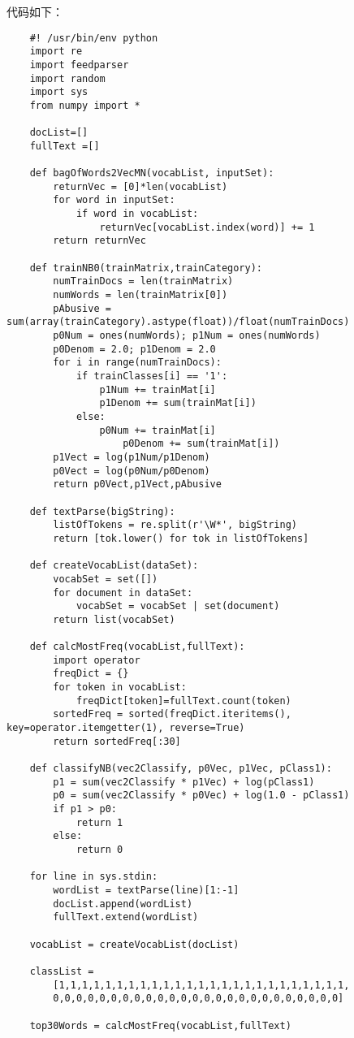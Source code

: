 代码如下：

\begin{lstlisting}
	#! /usr/bin/env python
	import re
	import feedparser
	import random
	import sys
	from numpy import *

	docList=[]
	fullText =[]

	def bagOfWords2VecMN(vocabList, inputSet):
	    returnVec = [0]*len(vocabList)
	    for word in inputSet:
	        if word in vocabList:
	            returnVec[vocabList.index(word)] += 1
	    return returnVec

	def trainNB0(trainMatrix,trainCategory):
	    numTrainDocs = len(trainMatrix)
	    numWords = len(trainMatrix[0])
	    pAbusive = sum(array(trainCategory).astype(float))/float(numTrainDocs)
	    p0Num = ones(numWords); p1Num = ones(numWords)
	    p0Denom = 2.0; p1Denom = 2.0
	    for i in range(numTrainDocs):
	        if trainClasses[i] == '1':
	            p1Num += trainMat[i]
	            p1Denom += sum(trainMat[i])
	        else:
	            p0Num += trainMat[i]
		            p0Denom += sum(trainMat[i])
	    p1Vect = log(p1Num/p1Denom)
	    p0Vect = log(p0Num/p0Denom)
	    return p0Vect,p1Vect,pAbusive

	def textParse(bigString):
	    listOfTokens = re.split(r'\W*', bigString)
	    return [tok.lower() for tok in listOfTokens]

	def createVocabList(dataSet):
	    vocabSet = set([])
	    for document in dataSet:
	        vocabSet = vocabSet | set(document)
	    return list(vocabSet)

	def calcMostFreq(vocabList,fullText):
	    import operator
	    freqDict = {}
	    for token in vocabList:
	        freqDict[token]=fullText.count(token)
	    sortedFreq = sorted(freqDict.iteritems(), key=operator.itemgetter(1), reverse=True)
	    return sortedFreq[:30]

	def classifyNB(vec2Classify, p0Vec, p1Vec, pClass1):
	    p1 = sum(vec2Classify * p1Vec) + log(pClass1)
	    p0 = sum(vec2Classify * p0Vec) + log(1.0 - pClass1)
	    if p1 > p0:
	        return 1
	    else:
	        return 0

	for line in sys.stdin:
	    wordList = textParse(line)[1:-1]
	    docList.append(wordList)
	    fullText.extend(wordList)

	vocabList = createVocabList(docList)

	classList =
	    [1,1,1,1,1,1,1,1,1,1,1,1,1,1,1,1,1,1,1,1,1,1,1,1,1,
	    0,0,0,0,0,0,0,0,0,0,0,0,0,0,0,0,0,0,0,0,0,0,0,0,0]

	top30Words = calcMostFreq(vocabList,fullText)


\end{lstlisting}
